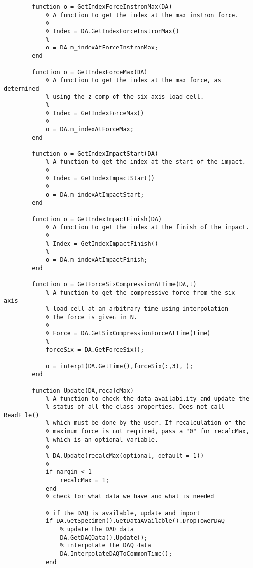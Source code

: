\begin{lstlisting}
        function o = GetIndexForceInstronMax(DA)
            % A function to get the index at the max instron force.
            %
            % Index = DA.GetIndexForceInstronMax()
            %
            o = DA.m_indexAtForceInstronMax;
        end
        
        function o = GetIndexForceMax(DA)
            % A function to get the index at the max force, as determined
            % using the z-comp of the six axis load cell.
            %
            % Index = GetIndexForceMax()
            %
            o = DA.m_indexAtForceMax;
        end
        
        function o = GetIndexImpactStart(DA)
            % A function to get the index at the start of the impact.
            %
            % Index = GetIndexImpactStart()
            %
            o = DA.m_indexAtImpactStart;
        end
        
        function o = GetIndexImpactFinish(DA)
            % A function to get the index at the finish of the impact.
            %
            % Index = GetIndexImpactFinish()
            %
            o = DA.m_indexAtImpactFinish;
        end
        
        function o = GetForceSixCompressionAtTime(DA,t)
            % A function to get the compressive force from the six axis
            % load cell at an arbitrary time using interpolation. 
            % The force is given in N.
            %
            % Force = DA.GetSixCompressionForceAtTime(time)
            %
            forceSix = DA.GetForceSix();
            
            o = interp1(DA.GetTime(),forceSix(:,3),t);
        end
        
        function Update(DA,recalcMax)
            % A function to check the data availability and update the
            % status of all the class properties. Does not call ReadFile()
            % which must be done by the user. If recalculation of the
            % maximum force is not required, pass a "0" for recalcMax, 
            % which is an optional variable. 
            %
            % DA.Update(recalcMax(optional, default = 1))
            %
            if nargin < 1
                recalcMax = 1;
            end
            % check for what data we have and what is needed
            
            % if the DAQ is available, update and import
            if DA.GetSpecimen().GetDataAvailable().DropTowerDAQ
                % update the DAQ data
                DA.GetDAQData().Update();
                % interpolate the DAQ data
                DA.InterpolateDAQToCommonTime();
            end
            

\end{lstlisting}
